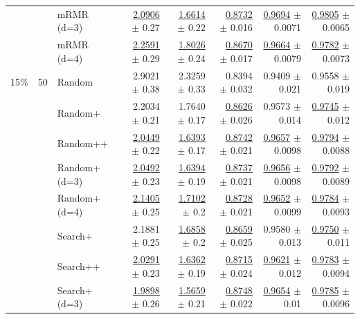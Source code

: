 \begin{longtable}{llp{}rrrrr}
 &  & mRMR (d=3) & \underline{2.0906} {\scriptsize $\pm$ 0.27} & \underline{1.6614} {\scriptsize $\pm$ 0.22} & \underline{0.8732} {\scriptsize $\pm$ 0.016} & \underline{0.9694} {\scriptsize $\pm$ 0.0071} & \underline{0.9805} {\scriptsize $\pm$ 0.0065} \\
 &  & mRMR (d=4) & \underline{2.2591} {\scriptsize $\pm$ 0.29} & \underline{1.8026} {\scriptsize $\pm$ 0.24} & \underline{0.8670} {\scriptsize $\pm$ 0.017} & \underline{0.9664} {\scriptsize $\pm$ 0.0079} & \underline{0.9782} {\scriptsize $\pm$ 0.0073} \\
\midrule
15\% & 50 & Random & 2.9021 {\scriptsize $\pm$ 0.38} & 2.3259 {\scriptsize $\pm$ 0.33} & 0.8394 {\scriptsize $\pm$ 0.032} & 0.9409 {\scriptsize $\pm$ 0.021} & 0.9558 {\scriptsize $\pm$ 0.019} \\
 &  & Random+ & 2.2034 {\scriptsize $\pm$ 0.21} & 1.7640 {\scriptsize $\pm$ 0.17} & \underline{0.8626} {\scriptsize $\pm$ 0.026} & 0.9573 {\scriptsize $\pm$ 0.014} & \underline{0.9745} {\scriptsize $\pm$ 0.012} \\
 &  & Random++ & \underline{2.0449} {\scriptsize $\pm$ 0.22} & \underline{1.6393} {\scriptsize $\pm$ 0.17} & \underline{0.8742} {\scriptsize $\pm$ 0.021} & \underline{0.9657} {\scriptsize $\pm$ 0.0098} & \underline{0.9794} {\scriptsize $\pm$ 0.0088} \\
 &  & Random+ (d=3) & \underline{2.0492} {\scriptsize $\pm$ 0.23} & \underline{1.6394} {\scriptsize $\pm$ 0.19} & \underline{0.8737} {\scriptsize $\pm$ 0.021} & \underline{0.9656} {\scriptsize $\pm$ 0.0098} & \underline{0.9792} {\scriptsize $\pm$ 0.0089} \\
 &  & Random+ (d=4) & \underline{2.1405} {\scriptsize $\pm$ 0.25} & \underline{1.7102} {\scriptsize $\pm$ 0.2} & \underline{0.8728} {\scriptsize $\pm$ 0.021} & \underline{0.9652} {\scriptsize $\pm$ 0.0099} & \underline{0.9784} {\scriptsize $\pm$ 0.0093} \\
 &  & Search+ & 2.1881 {\scriptsize $\pm$ 0.25} & \underline{1.6858} {\scriptsize $\pm$ 0.2} & \underline{0.8659} {\scriptsize $\pm$ 0.025} & 0.9580 {\scriptsize $\pm$ 0.013} & \underline{0.9750} {\scriptsize $\pm$ 0.011} \\
 &  & Search++ & \underline{2.0291} {\scriptsize $\pm$ 0.23} & \underline{1.6362} {\scriptsize $\pm$ 0.19} & \underline{0.8715} {\scriptsize $\pm$ 0.024} & \underline{0.9621} {\scriptsize $\pm$ 0.012} & \underline{0.9783} {\scriptsize $\pm$ 0.0094} \\
 &  & Search+ (d=3) & \underline{1.9898} {\scriptsize $\pm$ 0.26} & \underline{1.5659} {\scriptsize $\pm$ 0.21} & \underline{0.8748} {\scriptsize $\pm$ 0.022} & \underline{0.9654} {\scriptsize $\pm$ 0.01} & \underline{0.9785} {\scriptsize $\pm$ 0.0096} \\

\end{longtable}
